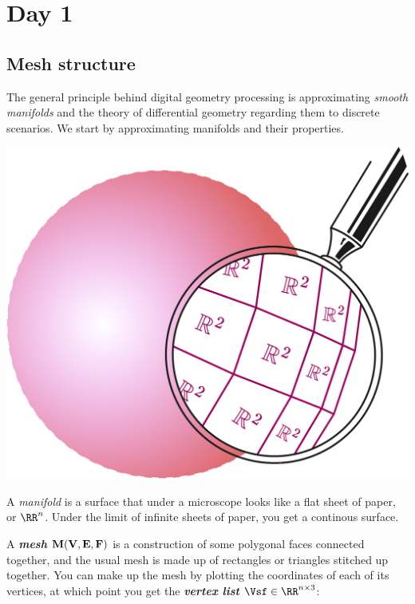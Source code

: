 \chapter{Day 1}



\section{Mesh structure}

The general principle behind digital geometry processing is
approximating \emph{smooth manifolds} and the theory of
differential geometry regarding them to discrete scenarios.
We start by approximating manifolds and their properties.

\begin{marginfigure}
    \centering
    \includegraphics[width=0.8\linewidth]{images/sphere1.png}
    \caption{ A \textit{manifold} is a surface that under a microscope looks like
a flat sheet of paper, or $\RR^n$. Under the limit of 
infinite sheets of paper, you get a continous surface.}
\end{marginfigure}

\spa

A \textbf{\emph{mesh}} $\bf{M(V,E,F)}$ is a construction of some polygonal faces 
connected together, and the usual mesh is made up of rectangles or triangles 
stitched up together. You can make up the mesh by plotting the coordinates
of each of its vertices, at which point you get the
\emph{\textbf{vertex list}} $\Vsf \in  \RR^{n \times 3}$:

